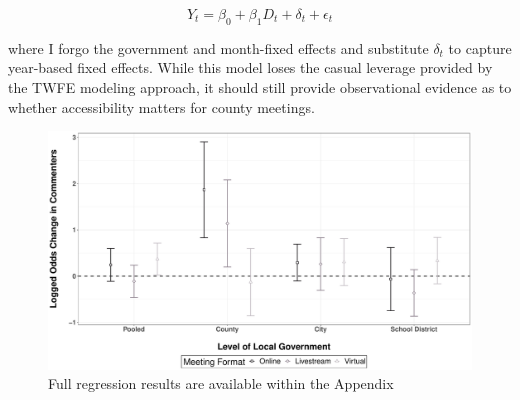     \begin{equation}\label{mod2}
        Y_{t}=\beta_{0}+\beta_1D_{t}+\delta_{t}+\epsilon_{t}
    \end{equation}

    \noindent where I forgo the government and month-fixed effects and substitute $\delta_t$ to capture year-based fixed effects. While this model loses the casual leverage provided by the TWFE modeling approach, it should still provide observational evidence as to whether accessibility matters for county meetings.

    \begin{figure}[H]
        \centering
         \par\medskip
        \includegraphics[scale=0.41]{Figures/MainDID.pdf}
        \caption[Effect of Meeting Format on Public Meeting Participation]{\footnotesize{Full regression results are available within the Appendix}}
        \label{fig:MainDID}
    \end{figure}

